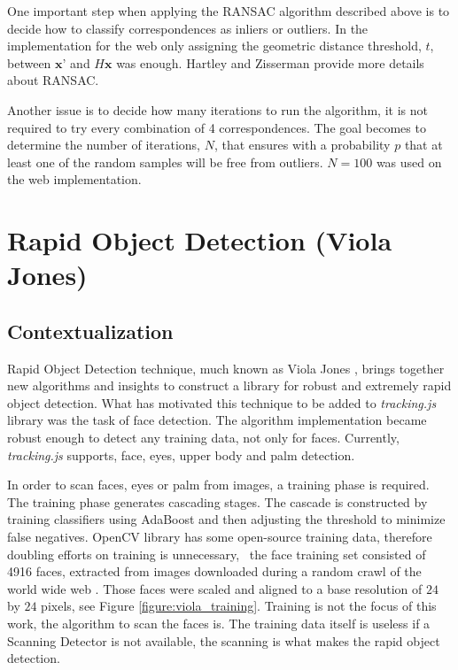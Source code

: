One important step when applying the RANSAC algorithm described above is to decide how to classify correspondences as inliers or outliers. In the implementation for the web only assigning the geometric distance threshold, $t$, between $\textbf{x'}$ and $H\textbf{x}$ was enough. Hartley and Zisserman \cite{Hartley2004} provide more details about RANSAC.

Another issue is to decide how many iterations to run the algorithm, it is not required to try every combination of 4 correspondences. The goal becomes to determine the number of iterations, $N$, that ensures with a probability $p$ that at least one of the random samples will be free from outliers. $N=100$ was used on the web implementation.



\section{Rapid Object Detection (Viola Jones)} %
\label{sec:tracking_library_for_the_web:rapid_object_detection}

\subsection{Contextualization} %
\label{sub:tracking_library_for_the_web:rapid_object_detection:contextualization}

Rapid Object Detection technique, much known as Viola Jones \cite{Viola2001}, brings together new algorithms and insights to construct a library for robust and extremely rapid object detection. What has motivated this technique to be added to \textit{tracking.js} library was the task of face detection. The algorithm implementation became robust enough to detect any training data, not only for faces. Currently, \textit{tracking.js} supports, face, eyes, upper body and palm detection.

In order to scan faces, eyes or palm from images, a training phase is required. The training phase generates cascading stages. The cascade is constructed by training classifiers using AdaBoost \cite{Viola2001} and then adjusting the threshold to minimize false negatives. OpenCV library \cite{Bradski2000} has some open-source training data, therefore doubling efforts on training is unnecessary, \ie\ the face training set consisted of 4916 faces, extracted from images downloaded during a random crawl of the world wide web \cite{Viola2001}. Those faces were scaled and aligned to a base resolution of $24$ by $24$ pixels, see Figure \ref{figure:viola_training}. Training is not the focus of this work, the algorithm to scan the faces is. The training data itself is useless if a Scanning Detector is not available, the scanning is what makes the rapid object detection.

